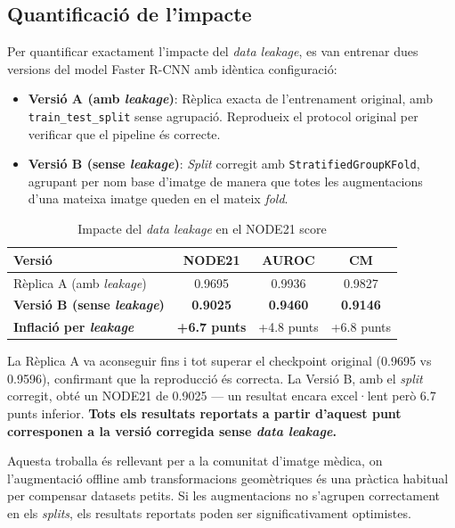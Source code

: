 \subsection{Quantificació de l'impacte}

Per quantificar exactament l'impacte del \textit{data leakage}, es van entrenar dues versions del model Faster R-CNN amb idèntica configuració:

\begin{itemize}
    \item \textbf{Versió A (amb \textit{leakage})}: Rèplica exacta de l'entrenament original, amb \texttt{train\_test\_split} sense agrupació. Reprodueix el protocol original per verificar que el pipeline és correcte.
    \item \textbf{Versió B (sense \textit{leakage})}: \textit{Split} corregit amb \texttt{StratifiedGroupKFold}, agrupant per nom base d'imatge de manera que totes les augmentacions d'una mateixa imatge queden en el mateix \textit{fold}.
\end{itemize}

\begin{table}[H]
\centering
\caption{Impacte del \textit{data leakage} en el NODE21 score}
\label{tab:leakage}
\begin{tabular}{lccc}
\toprule
\textbf{Versió} & \textbf{NODE21} & \textbf{AUROC} & \textbf{CM} \\
\midrule
Rèplica A (amb \textit{leakage}) & 0.9695 & 0.9936 & 0.9827 \\
\textbf{Versió B (sense \textit{leakage})} & \textbf{0.9025} & \textbf{0.9460} & \textbf{0.9146} \\
\midrule
\textbf{Inflació per \textit{leakage}} & \textbf{+6.7 punts} & +4.8 punts & +6.8 punts \\
\bottomrule
\end{tabular}
\end{table}

La Rèplica A va aconseguir fins i tot superar el checkpoint original (0.9695 vs 0.9596), confirmant que la reproducció és correcta. La Versió B, amb el \textit{split} corregit, obté un NODE21 de 0.9025 --- un resultat encara excel·lent però 6.7 punts inferior. \textbf{Tots els resultats reportats a partir d'aquest punt corresponen a la versió corregida sense \textit{data leakage}.}

Aquesta troballa és rellevant per a la comunitat d'imatge mèdica, on l'augmentació offline amb transformacions geomètriques és una pràctica habitual per compensar datasets petits. Si les augmentacions no s'agrupen correctament en els \textit{splits}, els resultats reportats poden ser significativament optimistes.

